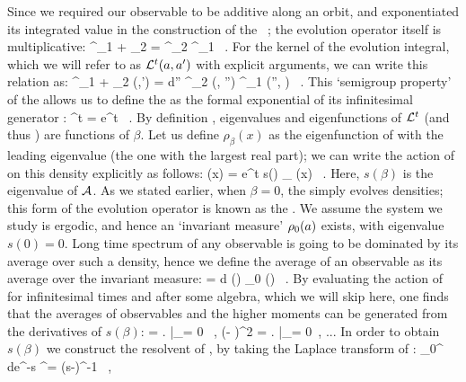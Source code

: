 Since we required our observable to be additive along an orbit, and 
exponentiated its integrated value in the construction of the \evOper\ 
; the evolution operator itself is multiplicative:
\beq
    \Lop^{\zeit_1 + \zeit_2} = \Lop^{\zeit_2} \Lop^{\zeit_1} \, .
    \label{eq-SemiGroup}
\eeq
For the kernel of the evolution integral, which we will refer to as 
${\cal L}^{t} (a, a')$ with explicit arguments, we can write this relation 
as:
\beq
	\Lop^{\zeit_1 + \zeit_2} (\ssp,\ssp') = 
    \int d\ssp'' \Lop^{\zeit_2} (\ssp, \ssp'') 
                   \Lop^{\zeit_1} (\ssp'', \ssp) \, .
	\label{eq-SemiGroupKernel}
\eeq
This `semigroup property'  of the {\evOper} allows us to 
define the {\evOper} as the formal exponential of its infinitesimal generator 
\Aop :
\beq
	\Lop^t = e^{\Aop t} \, .
	\label{eq-EvOpExp}
\eeq
By definition , eigenvalues and eigenfunctions of ${\cal L}^t$ (and
thus \Aop ) are functions of $\beta$. Let us define $\rho_{\beta} (x)$ as the
eigenfunction of  with the leading eigenvalue (the one with the
largest real part); we can write the action of \refeq{e-EvOper} on this density
explicitly as follows:
\beq
     (x) = e^{t s(\beta )} \rho_{\beta} (x) 
    \, .
    \label{eq-EigenvalueRel}
\eeq
Here, $s(\beta)$ is the eigenvalue of ${\cal A}$. As we stated earlier, when 
$\beta = 0$, the {\evOper} simply evolves densities; this form of the evolution
operator is known as the {\FPoper}. We assume the system we study is ergodic, 
and hence an `invariant measure' $\rho_0(a)$ exists, with eigenvalue 
$s(0) = 0$. Long time spectrum of any observable is going to be dominated by 
its average over such a density, hence we define the average of an observable
as its average over the invariant measure:
\beq
    \langle \obser \rangle = \int d \ssp \obser(\ssp) \rho_0 (\ssp) \, .
    \label{e-obserAvg}
\eeq
By evaluating the action of {\evOper}  for infinitesimal 
times and after some algebra, which we will skip here, one finds that the 
averages of observables and the higher moments can be generated from the 
derivatives of $s(\beta)$:
\beq
    \langle \obser \rangle = 
        \left.  \right|_{\beta = 0} \, , \quad
    \langle (\obser - \langle \obser \rangle )^2 \rangle = 
        \left.  \right|_{\beta = 0} \,, ...
    \label{eq-moments}
\eeq
In order to obtain $s(\beta)$ we construct the resolvent of \Aop , by taking 
the Laplace transform of \refeq{eq-EvOpExp}:
\beq
	\int_0^{\infty} d\zeit e^{-s\zeit} \Lop^\zeit = (s-\Aop)^{-1} \, ,
